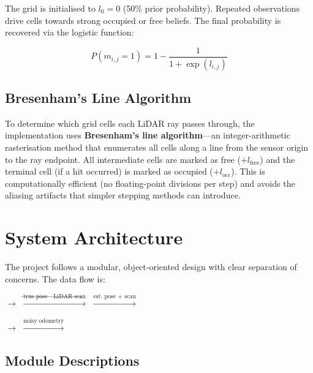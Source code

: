 \documentclass[12pt,a4paper]{article}
\begin{document}
The grid is initialised to \(l_0 = 0\) (50\% prior probability). Repeated observations drive cells towards strong occupied or free beliefs. The final probability is recovered via the logistic function:

\begin{equation}
    P(m_{i,j} = 1) = 1 - \frac{1}{1 + \exp(l_{i,j})}
\end{equation}

\subsection{Bresenham's Line Algorithm}

To determine which grid cells each LiDAR ray passes through, the implementation uses \textbf{Bresenham's line algorithm}---an integer-arithmetic rasterisation method that enumerates all cells along a line from the sensor origin to the ray endpoint. All intermediate cells are marked as free (\(+l_{\text{free}}\)) and the terminal cell (if a hit occurred) is marked as occupied (\(+l_{\text{occ}}\)). This is computationally efficient (no floating-point divisions per step) and avoids the aliasing artifacts that simpler stepping methods can introduce.

\section{System Architecture}

The project follows a modular, object-oriented design with clear separation of concerns. The data flow is:

\begin{center}
 $\longrightarrow$
 $\xrightarrow{\text{true pose} \to \text{LiDAR scan}}$
 $\xrightarrow{\text{est.\ pose + scan}}$
\end{center}

\vspace{0.3cm}
\begin{center}
 $\longrightarrow$
 $\xrightarrow{\text{noisy odometry}}$
\end{center}

\subsection{Module Descriptions}
\end{document}
